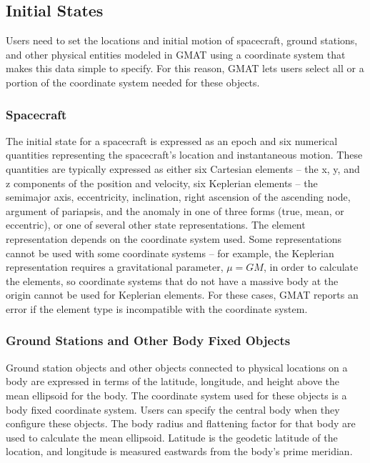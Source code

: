 \subsection{Initial States}

Users need to set the locations and initial motion of spacecraft, ground stations, and other
physical entities modeled in GMAT using a coordinate system that makes this data simple to specify.
For this reason, GMAT lets users select all or a portion of the coordinate system needed for these
objects.

\subsubsection{Spacecraft}

The initial state for a spacecraft is expressed as an epoch and six numerical quantities
representing the spacecraft's location and instantaneous motion. These quantities are typically
expressed as either six Cartesian elements -- the x, y, and z components of the position and
velocity, six Keplerian elements -- the semimajor axis, eccentricity, inclination, right ascension
of the ascending node, argument of pariapsis, and the anomaly in one of three forms (true, mean, or
eccentric), or one of several other state representations. The element representation depends on the
coordinate system used. Some representations cannot be used with some coordinate systems -- for
example, the Keplerian representation requires a gravitational parameter, $\mu=GM$, in order to
calculate the elements, so coordinate systems that do not have a massive body at the origin cannot
be used for Keplerian elements. For these cases, GMAT reports an error if the element type is
incompatible with the coordinate system.

\subsubsection{Ground Stations and Other Body Fixed Objects}

Ground station objects and other objects connected to physical locations on a body are expressed in
terms of the latitude, longitude, and height above the mean ellipsoid for the body. The coordinate
system used for these objects is a body fixed coordinate system. Users can specify the central body
when they configure these objects. The body radius and flattening factor for that body are used to
calculate the mean ellipsoid. Latitude is the geodetic latitude of the location, and longitude is
measured eastwards from the body's prime meridian.

